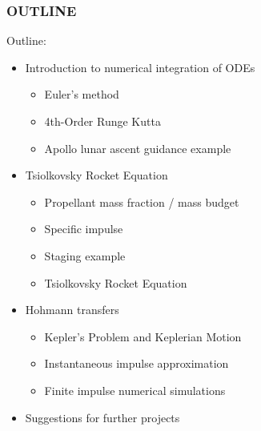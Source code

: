 \documentclass{beamer}
\begin{document}
\begin{frame}
  \frametitle{OUTLINE}
  Outline:
  \begin{itemize}
    \item Introduction to numerical integration of ODEs
      \begin{itemize}
        \item Euler's method
        \item 4th-Order Runge Kutta
        \item Apollo lunar ascent guidance example
      \end{itemize}
    \item Tsiolkovsky Rocket Equation
      \begin{itemize}
        \item Propellant mass fraction / mass budget
        \item Specific impulse
        \item Staging example
        \item Tsiolkovsky Rocket Equation
      \end{itemize}
    \item Hohmann transfers
      \begin{itemize}
        \item Kepler's Problem and Keplerian Motion
        \item Instantaneous impulse approximation
        \item Finite impulse numerical simulations
      \end{itemize}
    \item Suggestions for further projects
  \end{itemize}
\end{frame}
\end{document}
